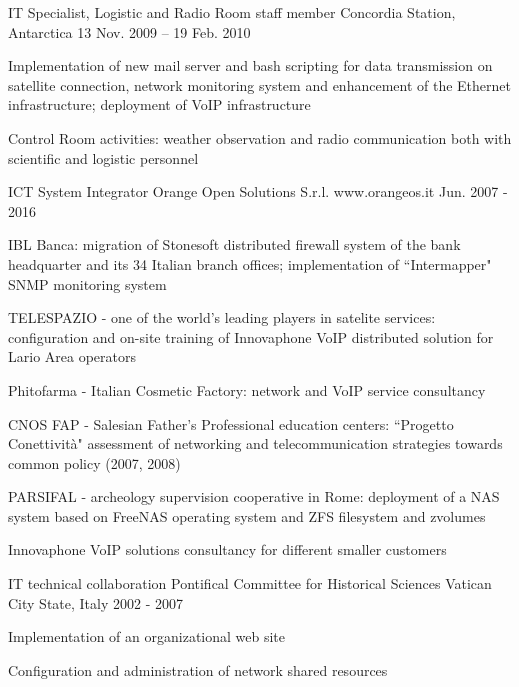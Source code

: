 \begin{cventries}
\cventry
{IT Specialist, Logistic and Radio Room staff member} %
{} %
{Concordia Station, Antarctica} %
{13 Nov. 2009 – 19 Feb. 2010} %
{ %
	\begin{cvitems}
		\item {Implementation of new mail server and bash scripting for data transmission on satellite connection, network monitoring system and enhancement of the Ethernet infrastructure; deployment of VoIP infrastructure}
		\item {Control Room activities: weather observation and radio communication both with scientific and logistic personnel}
	\end{cvitems}
}

\cventry
{ICT System Integrator} %
{Orange Open Solutions S.r.l.} %
{www.orangeos.it} %
{Jun. 2007 - 2016} %
{ %
	\begin{cvitems}
		\item {IBL Banca: migration of Stonesoft distributed firewall system of the bank headquarter and its 34 Italian branch offices; implementation of “Intermapper" SNMP monitoring system}
		\item {TELESPAZIO - one of the world's leading players in satelite services: configuration and on-site training of Innovaphone VoIP distributed solution for Lario Area operators}
		\item {Phitofarma - Italian Cosmetic Factory: network and VoIP service consultancy}
		\item {CNOS FAP - Salesian Father's Professional education centers: “Progetto Conettività" assessment of networking and telecommunication strategies towards common policy (2007, 2008)}
		\item {PARSIFAL - archeology supervision cooperative in Rome: deployment of a NAS system based on FreeNAS operating system and ZFS filesystem and zvolumes}
		\item {Innovaphone VoIP solutions consultancy for different smaller customers}
	\end{cvitems}
}

\cventry
{IT technical collaboration} %
{Pontifical Committee for Historical Sciences\linebreak{}} %
{Vatican City State, Italy} %
{2002 - 2007} %
{ %
	\begin{cvitems}
		\item {Implementation of an organizational web site}
		\item {Configuration and administration of network shared resources}
	\end{cvitems}
}


\end{cventries}
